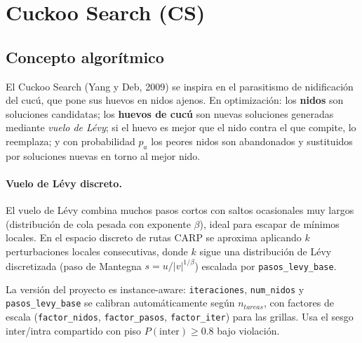 \section{Cuckoo Search (CS)}
\label{sec:mh-cs}

\subsection{Concepto algorítmico}
El Cuckoo Search (Yang y Deb, 2009) se inspira en el parasitismo de
nidificación del cucú, que pone sus huevos en nidos ajenos. En optimización:
los \textbf{nidos} son soluciones candidatas; los \textbf{huevos de cucú} son
nuevas soluciones generadas mediante \emph{vuelo de Lévy}; si el huevo es
mejor que el nido contra el que compite, lo reemplaza; y con probabilidad
$p_a$ los peores nidos son abandonados y sustituidos por soluciones nuevas en
torno al mejor nido.

\paragraph{Vuelo de Lévy discreto.} El vuelo de Lévy combina muchos pasos
cortos con saltos ocasionales muy largos (distribución de cola pesada con
exponente $\beta$), ideal para escapar de mínimos locales. En el espacio
discreto de rutas CARP se aproxima aplicando $k$ perturbaciones locales
consecutivas, donde $k$ sigue una distribución de Lévy discretizada (paso de
Mantegna $s = u/|v|^{1/\beta}$) escalada por \texttt{pasos\_levy\_base}.

La versión del proyecto es instance-aware: \texttt{iteraciones},
\texttt{num\_nidos} y \texttt{pasos\_levy\_base} se calibran automáticamente
según $n_{tareas}$, con factores de escala (\texttt{factor\_nidos},
\texttt{factor\_pasos}, \texttt{factor\_iter}) para las grillas. Usa el sesgo
inter/intra compartido con piso $P(\text{inter}) \ge 0.8$ bajo violación.

